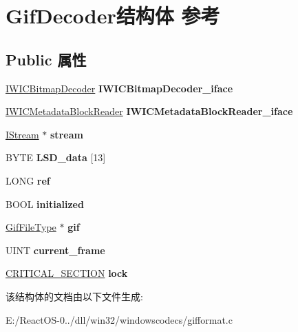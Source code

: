 \hypertarget{struct_gif_decoder}{}\section{Gif\+Decoder结构体 参考}
\label{struct_gif_decoder}
\subsection*{Public 属性}
\begin{DoxyCompactItemize}
\item 
\mbox{\label{struct_gif_decoder_a4d6cd632da1bf46753bcb522a4c231a7}} 
\hyperlink{interface_i_w_i_c_bitmap_decoder}{I\+W\+I\+C\+Bitmap\+Decoder} {\bfseries I\+W\+I\+C\+Bitmap\+Decoder\+\_\+iface}
\item 
\mbox{\label{struct_gif_decoder_ae4c091991d9c736468c9766b20768d96}} 
\hyperlink{interface_i_w_i_c_metadata_block_reader}{I\+W\+I\+C\+Metadata\+Block\+Reader} {\bfseries I\+W\+I\+C\+Metadata\+Block\+Reader\+\_\+iface}
\item 
\mbox{\label{struct_gif_decoder_afe7997277d68f1302ececa609b26212f}} 
\hyperlink{interface_i_stream}{I\+Stream} $\ast$ {\bfseries stream}
\item 
\mbox{\label{struct_gif_decoder_a4138f22773af624dfcef9f284d539266}} 
B\+Y\+TE {\bfseries L\+S\+D\+\_\+data} \mbox{[}13\mbox{]}
\item 
\mbox{\label{struct_gif_decoder_ab6b2b984b7f53c349b713b0a5fc231fb}} 
L\+O\+NG {\bfseries ref}
\item 
\mbox{\label{struct_gif_decoder_a2e0f3133ba3f8a0365a442ee1ee25610}} 
B\+O\+OL {\bfseries initialized}
\item 
\mbox{\label{struct_gif_decoder_ab131b5918efb57865d91cfd34442b2dd}} 
\hyperlink{struct_gif_file_type}{Gif\+File\+Type} $\ast$ {\bfseries gif}
\item 
\mbox{\label{struct_gif_decoder_ad23bf06741e80dcbec2393adf77d3d5e}} 
U\+I\+NT {\bfseries current\+\_\+frame}
\item 
\mbox{\label{struct_gif_decoder_a05bb65b3ce1c6c9095533d31cb831ee8}} 
\hyperlink{struct___c_r_i_t_i_c_a_l___s_e_c_t_i_o_n}{C\+R\+I\+T\+I\+C\+A\+L\+\_\+\+S\+E\+C\+T\+I\+ON} {\bfseries lock}
\end{DoxyCompactItemize}


该结构体的文档由以下文件生成\+:\begin{DoxyCompactItemize}
\item 
E\+:/\+React\+O\+S-\/0../dll/win32/windowscodecs/gifformat.\+c\end{DoxyCompactItemize}
